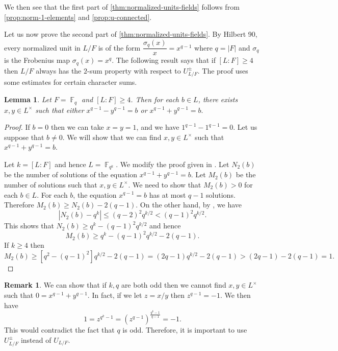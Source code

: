\documentclass[11pt, a4paper]{amsart}
\newtheorem{lem}[thm]{Lemma}
\theoremstyle{definition}
\newtheorem{rem}[thm]{Remark}
\DeclareMathOperator{\F}{\mathbb{F}}
\numberwithin{equation}{section}
\begin{document}
We then see that the first part of \cref{thm:normalized-units-fields} follows from \cref{prop:norm-1-elements} and \cref{prop:u-connected}. 



Let us now prove the second part of \cref{thm:normalized-units-fields}. By Hilbert 90, every normalized unit in $L/F$ is of the form $\dfrac{\sigma_q(x)}{x}=x^{q-1}$ where $q=|F|$ and $\sigma_q$ is the Frobenius map $\sigma_q(x)=x^{q}.$ %
The following result says that if $[L:F]\geq 4$ then $L/F$ always has the $2$-sum property  with respect to
$U_{L/F}^{\pm}$. The proof uses some estimates for certain character sums.
\begin{lem} \label{lem:[L:F]=4}
Let $F=\F_q$ and  $[L:F] \geq 4$. Then for each $b \in L$, there exists $x,y \in L^{\times}$ such that  either $x^{q-1}-y^{q-1}=b$ or 
$x^{q-1}+y^{q-1}=b .$
\end{lem}
\begin{proof}
If $b=0$ then we can take $x=y=1$, and we have  $1^{q-1}-1^{q-1}=0.$ Let us suppose that $b \neq 0.$ We will show that we can find $x,y \in L^{\times}$ such that $x^{q-1}+y^{q-1}=b.$

Let $k=[L:F]$ and hence $L=\F_{q^k}.$
We modify the proof given in \cite[Theorem 3]{bergelson2021sums}. Let $N_2(b)$ be the number of solutions of the equation $x^{q-1}+y^{q-1}=b.$ Let $M_2(b)$ be the number of solutions such that $x, y \in L^{\times}.$ We need to show that $M_2(b) > 0$ for each $b \in L.$ For each $b$, the equation $x^{q-1}=b$ has at most $q-1$ solutions. Therefore $M_2(b) \geq N_2(b)-2(q-1).$ On the other hand, by \cite[Corollary 1, p. 57]{joly1973equations}, we have 
\[ |N_2(b)-q^k| \leq (q-2)^2 q^{k/2}< (q-1)^2q^{k/2}. \]
This shows that $N_2(b) \geq q^k - (q-1)^2 q^{k/2}$ and hence 
\[ M_2(b) \geq q^{k}-(q-1)^2 q^{k/2}-2(q-1).\]
If $k \geq 4$ then 
\[ M_2(b) \geq  [q^2-(q-1)^2] q^{k/2} - 2(q-1) =(2q-1)q^{k/2} - 2(q-1)>(2q-1)-2(q-1)=1. \]
\end{proof}
\begin{rem} \label{rem:0-sum-of-q-1}
    We can show that if $k,q$ are both odd then we cannot find $x,y \in L^{\times}$ such that $0=x^{q-1}+y^{q-1}.$ In fact, if we let $z=x/y$ then $z^{q-1}=-1.$ 
    We then have 
    \[ 1 = z^{q^k-1}=(z^{q-1})^{\frac{q^k-1}{q-1}}=-1.\]
    This would contradict the fact that $q$ is odd. Therefore, it is important to use $U_{L/F}^{\pm}$ instead of $U_{L/F}.$
\end{rem}
\end{document}
